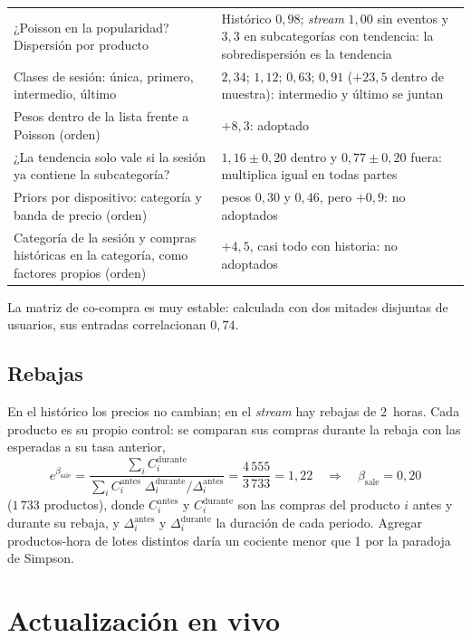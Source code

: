 \documentclass[11pt,a4paper]{article}
\begin{document}
\begin{center}
\begin{longtable}{@{}p{7.9cm}p{7.4cm}@{}}
¿Poisson en la popularidad? Dispersión por producto & Histórico $0{,}98$; \emph{stream} $1{,}00$ sin eventos y $3{,}3$ en subcategorías con tendencia: la sobredispersión es la tendencia\\
Clases de sesión: única, primero, intermedio, último & $2{,}34$; $1{,}12$; $0{,}63$; $0{,}91$ ($+23{,}5$ dentro de muestra): intermedio y último se juntan\\
Pesos dentro de la lista frente a Poisson (orden) & $+8{,}3$: adoptado\\
¿La tendencia solo vale si la sesión ya contiene la subcategoría? & $1{,}16\pm0{,}20$ dentro y $0{,}77\pm0{,}20$ fuera: multiplica igual en todas partes\\
Priors por dispositivo: categoría y banda de precio (orden) & pesos $0{,}30$ y $0{,}46$, pero $+0{,}9$: no adoptados\\
Categoría de la sesión y compras históricas en la categoría, como factores propios (orden) & $+4{,}5$, casi todo con historia: no adoptados\\
\bottomrule
\end{longtable}
\end{center}

La matriz de co-compra es muy estable: calculada con dos mitades disjuntas de usuarios, sus entradas
correlacionan $0{,}74$.

\subsection{Rebajas}

En el histórico los precios no cambian; en el \emph{stream} hay rebajas de 2~horas. Cada producto es su
propio control: se comparan sus compras durante la rebaja con las esperadas a su tasa anterior,
\[
e^{\beta_{\text{sale}}}=\frac{\sum_i C_i^{\text{durante}}}{\sum_i C_i^{\text{antes}}\;\Delta_i^{\text{durante}}/\Delta_i^{\text{antes}}}
=\frac{4\,555}{3\,733}=1{,}22\quad\Longrightarrow\quad\beta_{\text{sale}}=0{,}20
\]
($1\,733$ productos), donde $C_i^{\text{antes}}$ y $C_i^{\text{durante}}$ son las compras del producto $i$
antes y durante su rebaja, y $\Delta_i^{\text{antes}}$ y $\Delta_i^{\text{durante}}$ la duración de cada
periodo. Agregar productos-hora de lotes distintos daría un cociente menor que 1 por la
paradoja de Simpson.

\section{Actualización en vivo}
\end{document}
